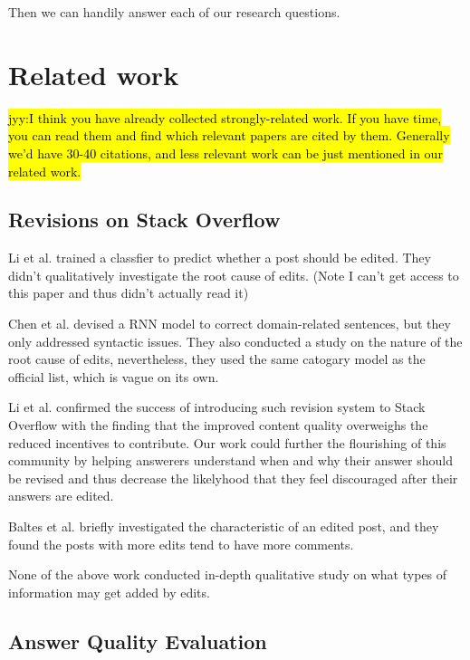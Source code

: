 \documentclass[10pt,conference]{IEEEtran}
\newcommand{\jyy}[1]{\sethlcolor{yellow}\hl{jyy:#1}\xspace}
\begin{document}
Then we can handily answer each of our research questions.

\section {Related work}

\jyy{I think you have already collected strongly-related work. If you have time, you can read them and find which relevant papers are cited by them. Generally we'd have 30-40 citations, and less relevant work can be just mentioned in our related work.}

\subsection {Revisions on Stack Overflow}

Li et al. \cite{JIT1397} trained a classfier to predict whether a post should be edited. 
They didn't qualitatively investigate the root cause of edits. 
(Note I can't get access to this paper and thus didn't actually read it)

Chen et al. \cite{Chen:2017:CCD:3171581.3134667} devised a RNN model to correct domain-related sentences, but they only addressed syntactic issues. 
They also conducted a study on the nature of the root cause of edits, nevertheless, they used the same catogary model as the official list, which is vague on its own.

Li et al. \cite{7208aa781175403f9c3aaddc19f3b8cf} confirmed the success of introducing such revision system to Stack Overflow with the finding that the improved content quality overweighs the reduced incentives to contribute. 
Our work could further the flourishing of this community by helping answerers understand when and why their answer should be revised and thus decrease the likelyhood that they feel discouraged after their answers are edited. 

Baltes et al. \cite{DBLP:journals/corr/abs-1803-07311} briefly investigated the characteristic of an edited post, and they found the posts with more edits tend to have more comments.  

None of the above work conducted in-depth qualitative study on what types of information may get added by edits. 

\subsection {Answer Quality Evaluation}
\end{document}
